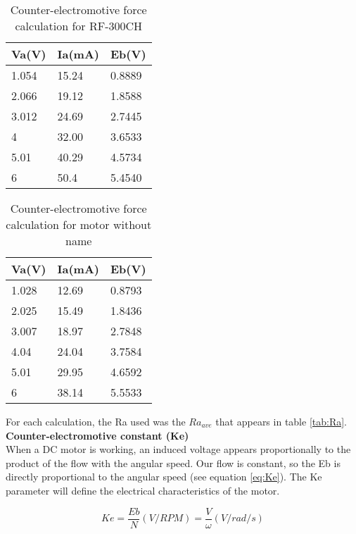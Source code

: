 \begin{table}[H]
\centering
\begin{tabular}{ | l | l | l |  }
\hline\hline
	\textbf{Va(V)} & \textbf{Ia(mA)} & \textbf{Eb(V)}  \\ \hline
	1.054 & 15.24& 0.8889  \\ \hline
	2.066 & 19.12  & 1.8588 \\ \hline
	3.012 & 24.69  & 2.7445 \\ \hline
	4 & 32.00 &3.6533 \\ \hline
	5.01 & 40.29 & 4.5734 \\ \hline
	6 & 50.4 & 5.4540 \\ \hline\hline
\end{tabular}
\caption{Counter-electromotive force calculation for RF-300CH} \label{tab:Eb2}
\end{table}


\begin{table}[H]
\centering
\begin{tabular}{ | l | l | l |  }
\hline\hline
	\textbf{Va(V)} & \textbf{Ia(mA)} & \textbf{Eb(V)}  \\ \hline
	1.028 & 12.69& 0.8793  \\ \hline
	2.025&15.49  & 1.8436\\ \hline
	3.007 & 18.97  & 2.7848 \\ \hline
	4.04 & 24.04 &3.7584 \\ \hline
	5.01 & 29.95 & 4.6592 \\ \hline
	6 & 38.14 & 5.5533 \\ \hline\hline
\end{tabular}
\caption{Counter-electromotive force calculation for motor without name} \label{tab:Eb3}
\end{table}

For each calculation, the Ra used was the $Ra_{ave}$ that appears in table \ref{tab:Ra}.\\



\textbf{Counter-electromotive constant  (Ke)} \\
 When a \acrshort{DC} motor is working, an induced voltage appears proportionally to the product of the flow with the angular speed. Our flow is constant, so the Eb is directly proportional to the angular speed (see equation \ref{eq:Ke}). The Ke parameter  will define the electrical  characteristics of the motor.

\begin{equation}
Ke=\frac{Eb}{N}(V/RPM)=\frac{V}{\omega} (V/rad/s)
\label{eq:Ke}
\end{equation}

